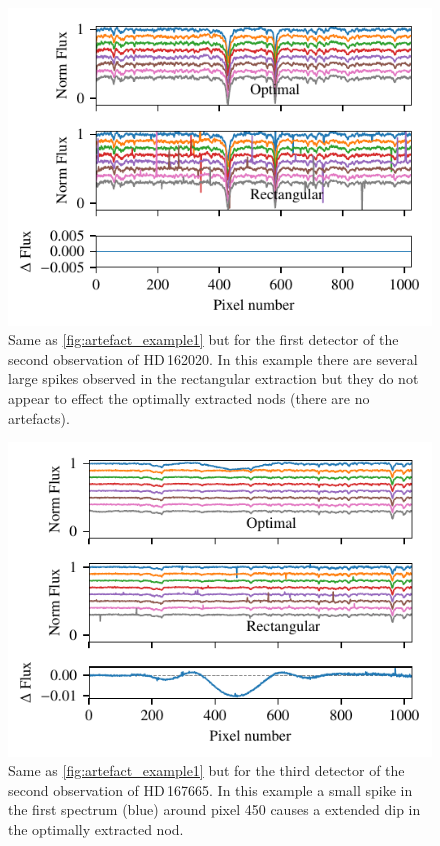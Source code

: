 \begin{figure}
    \centering
    \includegraphics[width=0.7\linewidth]{figures/appendix/bp_plots/rescaled_extraction_comparision_HD162020-2_chip_1}
    \caption[Extra artefact example for {HD\,162020}.]{Same as \cref{fig:artefact_example1} but for the first detector of the second observation of {HD\,162020}.
        In this example there are several large spikes observed in the rectangular extraction but they do not appear to effect the optimally extracted nods (there are no artefacts).}
    \label{fig:artefact_example2}
\end{figure}
\begin{figure}
    \centering
    \includegraphics[width=0.7\linewidth]{figures/appendix/bp_plots/extraction_comparision_HD167665-1b_chip_3}
    \caption[Extra artefact example for {HD\,167665}.]{Same as \cref{fig:artefact_example1} but for the third detector of the second observation of {HD\,167665}.
        In this example a small spike in the first spectrum (blue) around pixel 450 causes a extended dip in the optimally extracted nod.}
    \label{fig:artefact_example3}
\end{figure}
